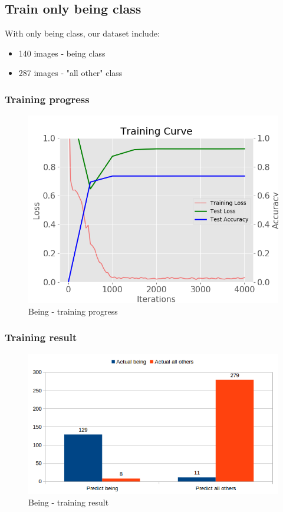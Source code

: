 \documentclass[11pt]{article}
\begin{document}
\subsection{Train only being class}
With only being class, our dataset include: 
\begin{itemize}
\item 140 images - being class
\item 287 images - "all other" class
\end{itemize}

\subsubsection{Training progress}

\begin{figure}[H]
\centering
\includegraphics[width=1\textwidth]{images/train_omit_other_only_being}
\caption{Being - training progress}
\end{figure}

\subsubsection{Training result}

\begin{figure}[H]
\centering
\includegraphics[width=1\textwidth]{images/omit_other_only_being}
\caption{Being - training result}
\end{figure}
\end{document}
